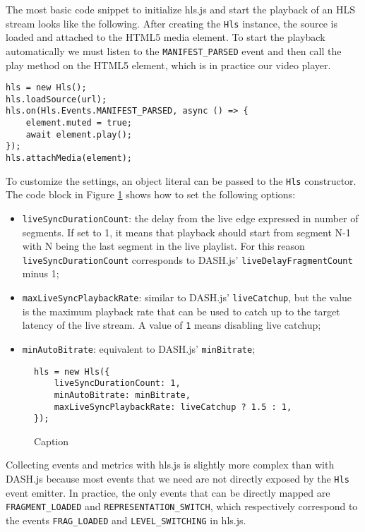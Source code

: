 The most basic code snippet to initialize hls.js and start the playback of an HLS stream looks like the following. After creating the \texttt{Hls} instance, the source is loaded and attached to the HTML5 media element. To start the playback automatically we must listen to the \texttt{MANIFEST\_PARSED} event and then call the play method on the HTML5 element, which is in practice our video player.

\begin{verbatim}
hls = new Hls();
hls.loadSource(url);
hls.on(Hls.Events.MANIFEST_PARSED, async () => {
    element.muted = true;
    await element.play();
});
hls.attachMedia(element);
\end{verbatim}

To customize the settings, an object literal can be passed to the \texttt{Hls} constructor. The code block in Figure \ref{fig:hlsjs_settings} shows how to set the following options:

\begin{itemize}
    \item \texttt{liveSyncDurationCount}: the delay from the live edge expressed in number of segments. If set to 1, it means that playback should start from segment N-1 with N being the last segment in the live playlist. For this reason \texttt{liveSyncDurationCount} corresponds to DASH.js' \texttt{liveDelayFragmentCount} minus 1;
    \item \texttt{maxLiveSyncPlaybackRate}: similar to DASH.js' \texttt{liveCatchup}, but the value is the maximum playback rate that can be used to catch up to the target latency of the live stream. A value of \texttt{1} means disabling live catchup;
    \item \texttt{minAutoBitrate}: equivalent to DASH.js' \texttt{minBitrate};
\end{itemize}

\begin{figure}
    \centering
    \begin{verbatim}
hls = new Hls({
    liveSyncDurationCount: 1,
    minAutoBitrate: minBitrate,
    maxLiveSyncPlaybackRate: liveCatchup ? 1.5 : 1,
});
    \end{verbatim}
    \caption{Caption}
    \label{fig:hlsjs_settings}
\end{figure}

Collecting events and metrics with hls.js is slightly more complex than with DASH.js because most events that we need are not directly exposed by the \texttt{Hls} event emitter. In practice, the only events that can be directly mapped are \texttt{FRAGMENT\_LOADED} and \texttt{REPRESENTATION\_SWITCH}, which respectively correspond to the events \texttt{FRAG\_LOADED} and \texttt{LEVEL\_SWITCHING} in hls.js.

